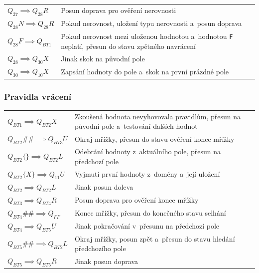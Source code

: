 \noindent
\begin{tabular}{@{}p{4cm} p{10.5cm}@{}}
    \(Q_{27} \implies Q_{28}R\) & Posun doprava pro ověření nerovnosti \\
    \(Q_{28}N \implies Q_{28}R\) & Pokud nerovnost, uložení typu nerovnosti
        a~posun doprava \\
    \(Q_{28}F \implies Q_{BT1}\) & Pokud nerovnost mezi uloženou hodnotou
        a~hodnotou \texttt{F} neplatí, přesun do stavu zpětného navrácení \\
    \(Q_{28} \implies Q_{30}X\) & Jinak skok na původní pole \\

    \(Q_{30} \implies Q_{10}X\) & Zapsání hodnoty do pole a~skok na první
        prázdné pole \\
\end{tabular}

\subsubsection*{Pravidla vrácení}
\begin{tabular}{@{}p{4cm} p{10.5cm}@{}}
    \(Q_{BT1} \implies Q_{BT2}X\) & Zkoušená hodnota nevyhovovala pravidlům,
        přesun na původní pole a~testování dalších hodnot \\
    \(Q_{BT2}\#\# \implies Q_{BT3}U\) & Okraj mřížky, přesun do stavu ověření
        konce mřížky \\
    \(Q_{BT2}\{\} \implies Q_{BT2}L\) & Odebrání hodnoty z~aktuálního pole,
        přesun na předchozí pole \\
    \(Q_{BT2}\{X\} \implies Q_{11}U\) & Vyjmutí první hodnoty z~domény a~její
        uložení \\
    \(Q_{BT2} \implies Q_{BT2}L\) & Jinak posun doleva \\
    \(Q_{BT3} \implies Q_{BT4}R\) & Posun doprava pro ověření konce mřížky \\
    \(Q_{BT4}\#\# \implies Q_{FF}\) & Konec mřížky, přesun do konečného stavu
        selhání \\
    \(Q_{BT4} \implies Q_{BT5}U\) & Jinak pokračování v~přesunu na předchozí
        pole \\
    \(Q_{BT5}\#\# \implies Q_{BT2}L\) & Okraj mřížky, posun zpět a~přesun do
        stavu hledání předchozího pole \\
    \(Q_{BT5} \implies Q_{BT5}R\) & Jinak posun doprava \\
\end{tabular}

